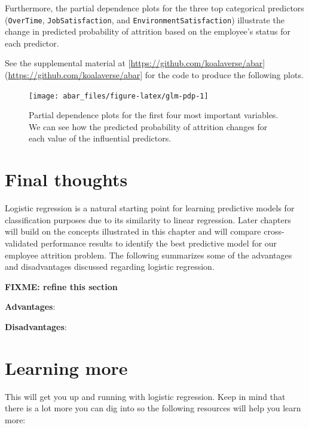 \documentclass[]{book}
\theoremstyle{definition}
\theoremstyle{definition}
\theoremstyle{definition}
\theoremstyle{remark}
\begin{document}
Furthermore, the partial dependence plots for the three top categorical
predictors (\texttt{OverTime}, \texttt{JobSatisfaction}, and
\texttt{EnvironmentSatisfaction}) illustrate the change in predicted
probability of attrition based on the employee's status for each
predictor.

\begin{tip}
See the supplemental material at
{[}\url{https://github.com/koalaverse/abar}{]}(\url{https://github.com/koalaverse/abar}{]}
for the code to produce the following plots.
\end{tip}

\begin{figure}

{\centering \texttt{[image: abar\_files/figure-latex/glm-pdp-1]} 

}

\caption{Partial dependence plots for the first four most important variables.  We can see how the predicted probability of attrition changes for each value of the influential predictors.}\label{fig:glm-pdp}
\end{figure}

\hypertarget{final-thoughts-1}{%
\section{Final thoughts}\label{final-thoughts-1}}

Logistic regression is a natural starting point for learning predictive
models for classification purposes due to its similarity to linear
regression. Later chapters will build on the concepts illustrated in
this chapter and will compare cross-validated performance results to
identify the best predictive model for our employee attrition problem.
The following summarizes some of the advantages and disadvantages
discussed regarding logistic regression.

\textbf{FIXME: refine this section}

\textbf{Advantages}:

\textbf{Disadvantages}:

\hypertarget{learning-more-1}{%
\section{Learning more}\label{learning-more-1}}

This will get you up and running with logistic regression. Keep in mind
that there is a lot more you can dig into so the following resources
will help you learn more:
\end{document}
